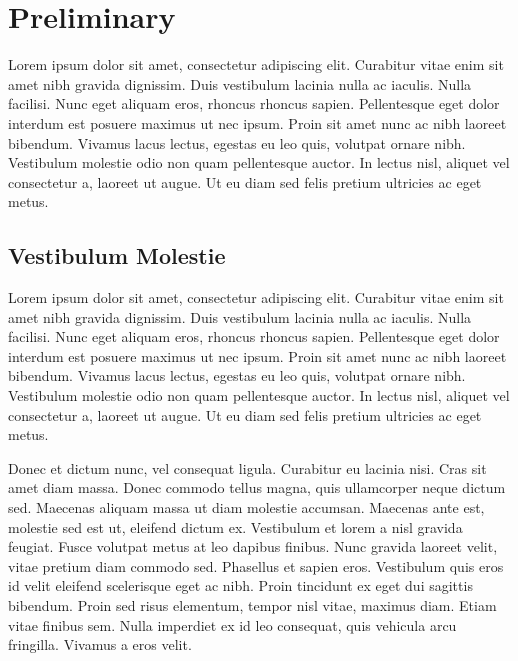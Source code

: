 \chapter{Preliminary}

Lorem ipsum dolor sit amet, consectetur \cite{knuth-fa} adipiscing elit. Curabitur vitae enim sit amet nibh gravida dignissim. Duis vestibulum lacinia nulla ac iaculis. Nulla facilisi. Nunc eget aliquam eros, rhoncus rhoncus sapien. Pellentesque eget dolor interdum est posuere maximus ut nec ipsum. Proin sit amet nunc ac nibh laoreet bibendum. Vivamus lacus lectus, egestas eu leo quis, volutpat ornare nibh. Vestibulum molestie odio non quam pellentesque auctor. In lectus nisl, aliquet vel consectetur a, laoreet ut augue. Ut eu diam sed felis pretium ultricies ac eget metus.

\section{Vestibulum Molestie}

Lorem ipsum dolor sit amet, consectetur \cite{knuth-fa} adipiscing elit. Curabitur vitae enim sit amet nibh gravida dignissim. Duis vestibulum lacinia nulla ac iaculis. Nulla facilisi. Nunc eget aliquam eros, rhoncus rhoncus sapien. Pellentesque eget dolor interdum est posuere maximus ut nec ipsum. Proin sit amet nunc ac nibh laoreet bibendum. Vivamus lacus lectus, egestas eu leo quis, volutpat ornare nibh. Vestibulum molestie odio non quam pellentesque auctor. In lectus nisl, aliquet vel consectetur a, laoreet ut augue. Ut eu diam sed felis pretium ultricies ac eget metus.

Donec et dictum nunc, vel consequat ligula. Curabitur eu lacinia nisi. Cras sit amet diam massa. Donec commodo tellus magna, quis ullamcorper neque dictum sed. Maecenas aliquam massa ut diam molestie accumsan. Maecenas ante est, molestie sed est ut, eleifend dictum ex. Vestibulum et lorem a nisl gravida feugiat. Fusce volutpat metus at leo dapibus finibus. Nunc gravida laoreet velit, vitae pretium diam commodo sed. Phasellus et sapien eros. Vestibulum quis eros id velit eleifend scelerisque eget ac nibh. Proin tincidunt ex eget dui sagittis bibendum. Proin sed risus elementum, tempor nisl vitae, maximus diam. Etiam vitae finibus sem. Nulla imperdiet ex id leo consequat, quis vehicula arcu fringilla. Vivamus a eros velit.

